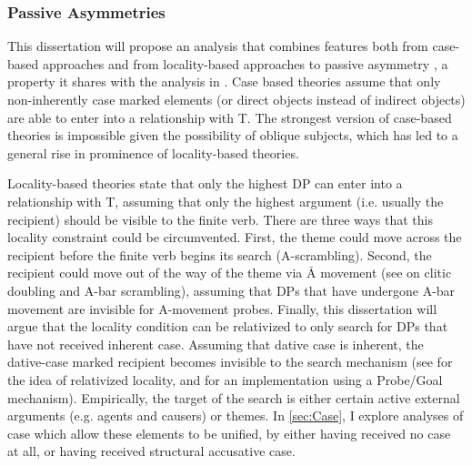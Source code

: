 \subsubsection{Passive Asymmetries}\label{sec:PassiveAsym}
This dissertation will propose an analysis that combines features both from case-based approaches \citep{Larson.1988,Baker.1988,Pesetsky.1996,Holmberg.2001} and from locality-based approaches to passive asymmetry \citep{Falk.1990,Holmberg.1995,McGinnis.1998,Anagnostopoulou.2003}, a property it shares with the analysis in \cite{Platzack.2005}. Case based theories assume that only non-inherently case marked elements (or direct objects instead of indirect objects) are able to enter into a relationship with T. The strongest version of case-based theories is impossible given the possibility of oblique subjects, which has led to a general rise in prominence of locality-based theories.

Locality-based theories state that only the highest DP can enter into a relationship with T, assuming that only the highest argument (i.e. usually the recipient) should be visible to the finite verb. There are three ways that this locality constraint could be circumvented. First, the theme could move across the recipient before the finite verb begins its search (A-scrambling). Second, the recipient could move out of the way of the theme via $\bar{\text{A}}$ movement (see \cite{Anagnostopoulou.2003} on clitic doubling and A-bar scrambling), assuming that DPs that have undergone A-bar movement are invisible for A-movement probes. Finally, this dissertation will argue that the locality condition can be relativized to only search for DPs that have not received inherent case. Assuming that dative case is inherent, the dative-case marked recipient becomes invisible to the search mechanism (see \cite{Rizzi.1990} for the idea of relativized locality, and \cite{Chomsky.2001} for an implementation using a Probe/Goal mechanism). Empirically, the target of the search is either certain active external arguments (e.g. agents and causers) or themes. In \autoref{sec:Case}, I explore analyses of case which allow these elements to be unified, by either having received no case at all, or having received structural accusative case.

